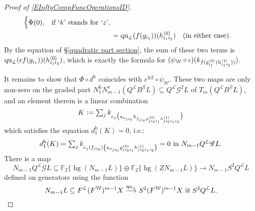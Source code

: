 \documentclass[11pt]{amsart} \renewcommand{\baselinestretch}{1.4}
\theoremstyle{plain}
\theoremstyle{definition}
\DeclareMathOperator{\homog}{hg}
\renewcommand{\to}{\longrightarrow}
\newcommand{\scrG}{\mathscr{G}}
\newcommand{\calL}{\mathcal{L}}
\newcommand{\calw}{\mathcal{W}}
\newcommand{\call}{\mathcal{L}}
\newcommand{\BSW}{{\scrG}}
\newcommand{\BSWres}{B^\BSW}%
\newcommand{\quadratic}{\mathrm{qu}}
\newcommand{\F}{\mathbb{F}}
\newcommand{\Ftwo}{\F_2}
\newcommand{\uver}{^\mathrm{v}}
\newcommand{\uhor}{^\mathrm{h}}
\begin{document}
\begin{Operations in composite functor spectral sequences}
\begin{proof}[Proof of \ref{EInftyCompFuncOperationsID}]
\begin{alignat*}{2}
\begin{cases}
\Phi(0),&\textup{if `$k$' stands for `$z$'},
\end{cases}\\
&={\quadratic_\call}(f(g_{i_1}))(h^{\smash{\langle} 0\smash{\rangle}}_{i_1i_2})\quad\textup{(in either case).}
\end{alignat*}
By the equation of \S\ref{quadratic part section}, the sum of these two terms is ${\quadratic_\call}(\epsilon f(g_{i_1}))(h^{\smash{\langle} 0\smash{\rangle}}_{i_1i_2})$, which is exactly the formula for $(\psi_{\calw}\circ\epsilon)(k_{f\relax (g^{\smash{\langle} 0\smash{\rangle}}_{i_1}(h^{\smash{\langle} 1\smash{\rangle}}_{i_1i_2}))})$.

It remains to show that $\Phi\circ d\uhor$ coincides with $\epsilon^{\otimes 2}\circ\psi_{\calw}$. These two maps are only non-zero on the graded part $N\uhor_1N\uver_{m-1}(Q^{\call}\BSWres L)\subseteq Q^{\calL}\BSW^2 L$ of  $T_{m}(Q^{\calL}\BSWres L)$, and an element therein is a linear combination
\[K:=\textstyle\sum_j k_{e_j\bigl(\smash{s_{\alpha_{ji_0}} k_{f\relax _{ji_0}g^{\smash{\langle} 0\smash{\rangle}}_{ji_0i_1}h^{\smash{\langle} 1\smash{\rangle}}_{ji_0i_1i_2}}}\bigr)}\]
which satisfies the equation $d\uhor_1(K)=0$, i.e.:
\[d\uhor_1(K)=\textstyle\sum_j \smash{k_{e_j(f_{ji_0})\left(s_{\alpha_{ji_0}} {g^{\smash{\langle} 0\smash{\rangle}}_{ji_0i_1}h^{\smash{\langle} 1\smash{\rangle}}_{ji_0i_1i_2}}\right)}}=0\textup{ in }N_{m-1}Q^{\calL}\BSW L.\]
%
%
There is a map 
\[N_{m-1}Q^{\calL}\BSW L \subseteq \Ftwo \{\homog( N_{m-1}L)\} \oplus \Ftwo \{\homog( ZN_{m-1}L)\}\to N_{m-1}S^2Q^{\calL}L\]
defined on generators using the function
\[N_{m-1}L\subseteq F^{\calL}(F^{\calw})^{m-1}X \smash{{}\overset{\quadratic_\call}{\to}{}}S^2(F^{\calw})^{m-1}X\cong S^2Q^{\calL}L.\]

\end{proof}
\end{Operations in composite functor spectral sequences}
\end{document}
